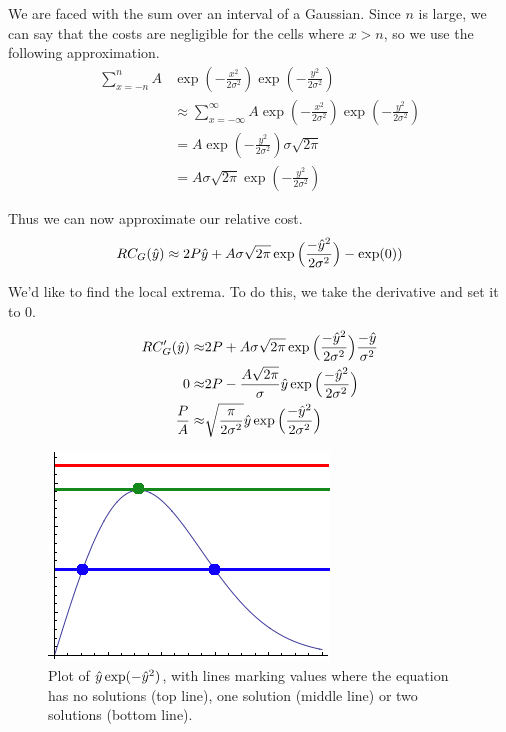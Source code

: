 We are faced with the sum over an interval of a Gaussian. Since $n$ is large, we can say that the costs are negligible for the cells where $x>n$, so we use the following approximation. 
\begin{align*}
        \sum\limits_{x=-n}^{n} A&\exp\left(-\frac{x^2}{2\sigma^2}\right)\exp\left(-\frac{y^2}{2\sigma^2}\right) \\
&\approx \sum\limits_{x=-\infty}^{\infty} A\exp\left(-\frac{x^2}{2\sigma^2}\right)\exp\left(-\frac{y^2}{2\sigma^2}\right)  \\
&= A\exp\left(-\frac{y^2}{2\sigma^2}\right)\sigma\sqrt{2\pi} \\
&= A\sigma\sqrt{2\pi}\exp\left(-\frac{y^2}{2\sigma^2}\right)
\end{align*}

Thus we can now approximate our relative cost. 
\[
RC_G(\hat{y}) \approx 2P\hat{y} + A\sigma\sqrt{2\pi} \exp\Big(\frac{-\hat{y}^2}{2\sigma^2}\Big) - \exp(0) ) \\
\]

We'd like to find the local extrema. To do this, we take the derivative and set it to 0. 
\begin{align}
RC'_G(\hat{y}) \approx& 2P + A\sigma\sqrt{2\pi}             \exp\Big( \frac{-\hat{y}^2}{2\sigma^2} \Big) \frac{-\hat{y}}{\sigma^2}\notag\\
0  \approx& 2P - \frac{A\sqrt{2\pi}}{\sigma}        \hat{y} \exp\Big( \frac{-\hat{y}^2}{2\sigma^2} \Big) \notag\\
  \frac{P}{A} \approx& \sqrt{\frac{\pi}{2\sigma^2}} \hat{y} \exp\Big( \frac{-\hat{y}^2}{2\sigma^2} \Big) 
\end{align}
\begin{figure}
\centering
\includegraphics[width=0.4\columnwidth]{graphix/lambert.png}
\caption{Plot of $\hat{y} \exp(-\hat{y}^2)$, with lines marking values where the equation has no solutions (top line), one solution (middle line) or two solutions (bottom line).}
\label{fig:lambert}
\end{figure}

